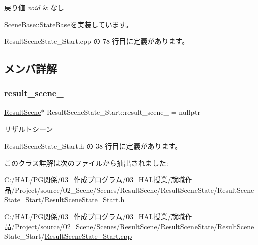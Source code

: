 \begin{DoxyRetVals}{戻り値}
{\em void} & なし \\
\hline
\end{DoxyRetVals}


\mbox{\hyperlink{class_scene_base_1_1_state_base_ad2c6c8fd9f020eb02f64f394edee129c}{Scene\+Base\+::\+State\+Base}}を実装しています。



 Result\+Scene\+State\+\_\+\+Start.\+cpp の 78 行目に定義があります。



\subsection{メンバ詳解}
\mbox{\label{class_result_scene_state___start_a223a52e93231e460dad3401a1a49931d}} 
\subsubsection{\texorpdfstring{result\+\_\+scene\+\_\+}{result\_scene\_}}
{\footnotesize\ttfamily \mbox{\hyperlink{class_result_scene}{Result\+Scene}}$\ast$ Result\+Scene\+State\+\_\+\+Start\+::result\+\_\+scene\+\_\+ = nullptr\hspace{0.3cm}{\ttfamily [protected]}}



リザルトシーン 



 Result\+Scene\+State\+\_\+\+Start.\+h の 38 行目に定義があります。



このクラス詳解は次のファイルから抽出されました\+:\begin{DoxyCompactItemize}
\item 
C\+:/\+H\+A\+L/\+P\+G関係/03\+\_\+作成プログラム/03\+\_\+\+H\+A\+L授業/就職作品/\+Project/source/02\+\_\+\+Scene/\+Scenes/\+Result\+Scene/\+Result\+Scene\+State/\+Result\+Scene\+State\+\_\+\+Start/\mbox{\hyperlink{_result_scene_state___start_8h}{Result\+Scene\+State\+\_\+\+Start.\+h}}\item 
C\+:/\+H\+A\+L/\+P\+G関係/03\+\_\+作成プログラム/03\+\_\+\+H\+A\+L授業/就職作品/\+Project/source/02\+\_\+\+Scene/\+Scenes/\+Result\+Scene/\+Result\+Scene\+State/\+Result\+Scene\+State\+\_\+\+Start/\mbox{\hyperlink{_result_scene_state___start_8cpp}{Result\+Scene\+State\+\_\+\+Start.\+cpp}}\end{DoxyCompactItemize}
